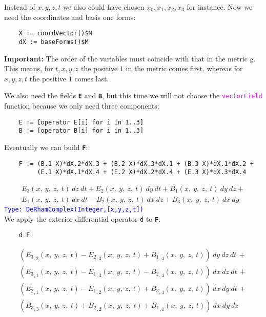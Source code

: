 \documentclass[12pt,a4paper]{article}
\newcommand{\spadfun}[1]{\textcolor{magenta}{\tt #1}}
\newcommand{\spadbold}[1]{{\tt\bf #1}}
\newcommand{\type}[1]{\textcolor{blue}{\tt\tiny #1}}
\begin{document}
Instead of $x,y,z,t$ we also could have chosen $x_0,x_1,x_2,x_3$
for instance. Now we need the coordinates and basis one forms:
\begin{lstlisting}
    X := coordVector()$M
    dX := baseForms()$M
\end{lstlisting}
{\bf Important:} The order of the variables must coincide with that in 
the metric g. This means, for $t,x,y,z$ the positive $1$ in the 
metric comes first, whereas for $x,y,z,t$ the positive $1$ comes last.

We also need the fields \spadbold{E} and \spadbold{B}, but this time we 
will not choose the \spadfun{vectorField} function because we only need 
three components:
\begin{lstlisting}
    E := [operator E[i] for i in 1..3]
    B := [operator B[i] for i in 1..3]
\end{lstlisting}
Eventually we can build \spadbold{F}:
\begin{lstlisting}
    F := (B.1 X)*dX.2*dX.3 + (B.2 X)*dX.3*dX.1 + (B.3 X)*dX.1*dX.2 +
         (E.1 X)*dX.1*dX.4 + (E.2 X)*dX.2*dX.4 + (E.3 X)*dX.3*dX.4
\end{lstlisting}
\begin{eqnarray*}
    {{{E _ {3}}\left({x, \: y, \: z, \: t}\right)}
    \  dz \  dt}+{{{E _ {2}}\left({x, \: y, \: z, \: t}\right)}
    \  dy \  dt}+{{{B _ {1}}\left({x, \: y, \: z, \: t}\right)} 
    \  dy \  dz} + \\
    {{{E _ {1}}\left({x, \: y, \: z, \: t}\right)}
    \  dx \  dt} -{{{B _ {2}}\left({x, \: y, \: z, \: t}\right)}
    \  dx \  dz}+{{{B _ {3}}\left({x, \: y, \: z, \: t}\right)}
    \  dx \  dy}    
\end{eqnarray*}
\type{Type: DeRhamComplex(Integer,[x,y,z,t])}
\\
We apply the exterior differential operator {\tt d} to 
\spadbold{F}:
\begin{lstlisting}
    d F
\end{lstlisting}
\begin{eqnarray*}
    {{\left( {{{E _ {3}} _ {{,2}}}\left({x, \: y, \: z, \: t}\right)}
    -{{{E _ {2}} _ {{,3}}}\left({x, \: y, \: z, \: t}\right)}+{{{B
    _ {1}} _ {{,4}}}\left({x, \: y, \: z, \: t}\right)}\right)}
    \  dy \  dz \  dt}\, + \\ 
    {{\left( {{{E _ {3}} _ {{,1}}}\left(
    {x, \: y, \: z, \: t}\right)}-{{{E _ {1}} _ {{,3}}}\left(
    {x, \: y, \: z, \: t}\right)}-{{{B _ {2}} _ {{,4}}}\left(
    {x, \: y, \: z, \: t}\right)}\right)}\  dx \  dz \  dt}\, + \\
    {{\left( {{{E _ {2}} _ {{,1}}}\left({x, \: y, \: z, \: t}
    \right)}-{{{E _ {1}} _ {{,2}}}\left({x, \: y, \: z, \: t}
    \right)}+{{{B_ {3}} _ {{,4}}}\left({x, \: y, \: z, \: t}
    \right)}\right)}\  dx \  dy \  dt}\, + \\ 
    {{\left( {{{B _ {3}} _ {{,3}}}\left({x, \: y, \: z, \: t}
    \right)}+{{{B_ {2}} _ {{,2}}}\left({x, \: y, \: z, \: t}
    \right)}+{{{B_ {1}} _ {{,1}}}\left({x, \: y, \: z, \: t}
    \right)}\right)}\  dx \  dy \  dz}
\end{eqnarray*}       
\end{document}
